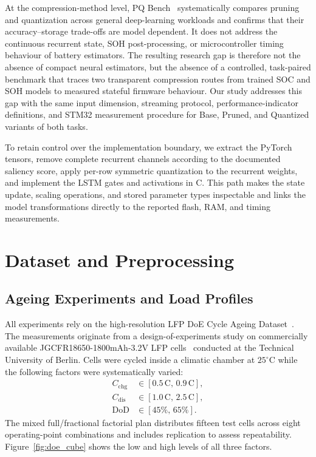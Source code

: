 \documentclass[final,3p,times]{elsarticle}
\begin{document}
At the compression-method level, PQ Bench~\cite{schulzePQBenchBenchmarking2025} systematically compares pruning and quantization across general deep-learning workloads and confirms that their accuracy--storage trade-offs are model dependent. It does not address the continuous recurrent state, SOH post-processing, or microcontroller timing behaviour of battery estimators. The resulting research gap is therefore not the absence of compact neural estimators, but the absence of a controlled, task-paired benchmark that traces two transparent compression routes from trained SOC and SOH models to measured stateful firmware behaviour. Our study addresses this gap with the same input dimension, streaming protocol, performance-indicator definitions, and STM32 measurement procedure for Base, Pruned, and Quantized variants of both tasks.

To retain control over the implementation boundary, we extract the PyTorch tensors, remove complete recurrent channels according to the documented saliency score, apply per-row symmetric quantization to the recurrent weights, and implement the LSTM gates and activations in C. This path makes the state update, scaling operations, and stored parameter types inspectable and links the model transformations directly to the reported flash, RAM, and timing measurements.
\section{Dataset and Preprocessing}
\subsection{Ageing Experiments and Load Profiles}
All experiments rely on the high-resolution LFP DoE Cycle Ageing Dataset~\cite{LFP_DoE_Cycle_Aging_Dataset}. The measurements originate from a design-of-experiments study on commercially available JGCFR18650-1800mAh-3.2V LFP cells~\cite{jgneJGCFR186501800mAh32VProductSpecification} conducted at the Technical University of Berlin. Cells were cycled inside a climatic chamber at $25^\circ\mathrm{C}$ while the following factors were systematically varied:
\begin{align}
    C_{\mathrm{chg}} &\in [0.5\,\mathrm{C},\,0.9\,\mathrm{C}],\\
    C_{\mathrm{dis}} &\in [1.0\,\mathrm{C},\,2.5\,\mathrm{C}],\\
    \mathrm{DoD} &\in [45\%,\,65\%].
\end{align}
The mixed full/fractional factorial plan distributes fifteen test cells across eight operating-point combinations and includes replication to assess repeatability. Figure~\ref{fig:doe_cube} shows the low and high levels of all three factors.
\end{document}
